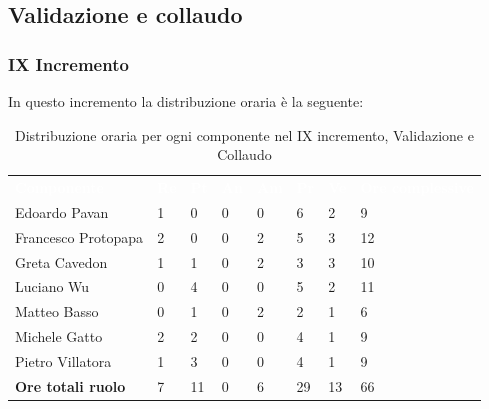 \subsection{Validazione e collaudo}

\subsubsection{IX Incremento}
In questo incremento la distribuzione oraria è la seguente:
\begin{table}[H]
\begin{center}
\renewcommand{\arraystretch}{1.25}
\begin{tabular}{ m{}<{\centering}  m{}<{\centering} m{}<{\centering} m{}<{\centering}  m{}<{\centering}  m{}<{\centering}  m{}<{\centering}  m{}<{\centering}   }
	\rowcolor{darkblue}
	\textcolor{white}{\textbf{Componente}} &\textcolor{white}{\textbf{Re}}&\textcolor{white}{\textbf{Pt}}&\textcolor{white}{\textbf{An}}&\textcolor{white}{\textbf{Am}}&\textcolor{white}{\textbf{Pr}}&\textcolor{white}{\textbf{Ve}}&\textcolor{white}{\textbf{Ore complessive}}\\ 
	Edoardo Pavan & 1 & 0 & 0 & 0 & 6 & 2 & 9 \\	
	
	Francesco Protopapa & 2 & 0 & 0 & 2 & 5 & 3 & 12 \\

	Greta Cavedon & 1 & 1 & 0 & 2 & 3 & 3 & 10 \\
	
	Luciano Wu & 0 & 4 & 0 & 0 & 5 & 2 & 11 \\
	
	Matteo Basso & 0 & 1 & 0 & 2 & 2 & 1 & 6 \\
	
	Michele Gatto & 2 & 2 & 0 & 0 & 4 & 1 & 9 \\
	
	Pietro Villatora & 1 & 3 & 0 & 0 & 4 & 1 & 9 \\
	
	\textbf{Ore totali ruolo} & 7 & 11 & 0 & 6 & 29 & 13 & 66 \\

\end{tabular}
\caption{Distribuzione oraria per ogni componente nel IX incremento, Validazione e Collaudo}
\end{center}
\end{table}

